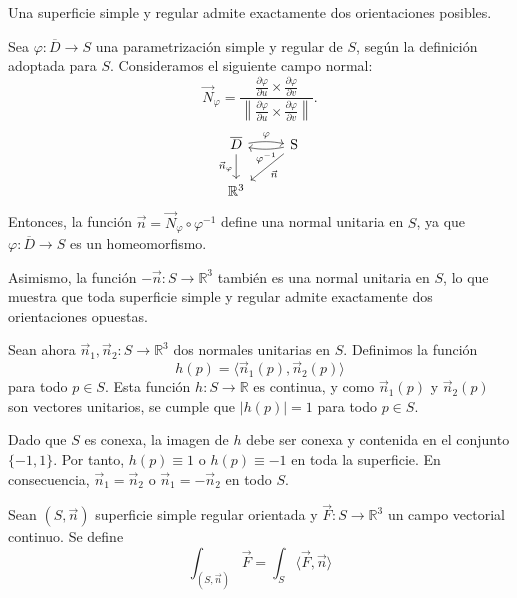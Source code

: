 \begin{observación}
Una superficie simple y regular admite exactamente dos orientaciones posibles.

Sea \( \varphi : \overline{D} \to S \) una parametrización simple y regular de
\( S \), según la definición adoptada para \( S \). Consideramos el siguiente
campo normal:
\[
    \vec{N}_{\varphi} = \frac{\frac{\partial \varphi}{\partial u} \times \frac{\partial \varphi}{\partial v}}{\left\| \frac{\partial \varphi}{\partial u} \times \frac{\partial \varphi}{\partial v} \right\|}.
\]
\[
    \begin{tikzcd}
        {\overline{D}} \arrow[d, "\vec{n}_\varphi" left]
        \arrow[r, bend left=10, "\varphi"]
        & \operatorname{S}
        \arrow[dl, "\vec{n}"]
        \arrow[l, bend left=10, "\varphi^{-1}"] \\
        {\mathbb{R}^3}
    \end{tikzcd}
\]
Entonces, la función \( \vec{n} = \vec{N}_{\varphi} \circ \varphi^{-1} \)
define una normal unitaria en \( S \), ya que \( \varphi : \overline{D} \to S
\) es un homeomorfismo.

Asimismo, la función \( -\vec{n} : S \to \mathbb{R}^3 \) también es una normal
unitaria en \( S \), lo que muestra que toda superficie simple y regular admite
exactamente dos orientaciones opuestas.

Sean ahora \( \vec{n}_1, \vec{n}_2 : S \to \mathbb{R}^3 \) dos normales
unitarias en \( S \). Definimos la función
\[
    h(p) = \langle \vec{n}_1(p), \vec{n}_2(p) \rangle
\]
para todo \( p \in S \). Esta función \( h : S \to \mathbb{R} \) es continua, y
como \( \vec{n}_1(p) \) y \( \vec{n}_2(p) \) son vectores unitarios, se cumple
que \( |h(p)| = 1 \) para todo \( p \in S \).

Dado que \( S \) es conexa, la imagen de \( h \) debe ser conexa y contenida en
el conjunto \( \{-1, 1\} \). Por tanto, \( h(p) \equiv 1 \) o \( h(p) \equiv -1
\) en toda la superficie. En consecuencia, \( \vec{n}_1 = \vec{n}_2 \) o \(
\vec{n}_1 = -\vec{n}_2 \) en todo \( S \).
\end{observación}

\begin{definición} 
Sean $(S, \vec{n})$ superficie simple regular orientada y $\vec{F} : S \to \mathbb{R}^3$ un campo vectorial continuo. Se define
$$ \int_{(S, \vec{n})} \vec{F} = \int_{S} \langle \vec{F}, \vec{n} \rangle$$
\end{definición}

